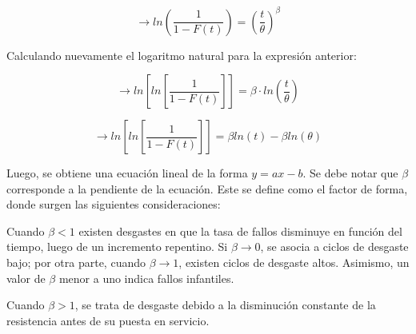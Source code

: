 \begin{equation}
\rightarrow ln\left( \frac{1}{1-F(t)} \right)=\left( \frac{t}{\theta}\right)^\beta 
\end{equation}

Calculando nuevamente el logaritmo natural para la expresión anterior:

\begin{equation}
\rightarrow ln\left[ln\left[\frac{1}{1-F(t)}\right]\right]=\beta\cdot ln\left(\frac{t}{\theta}\right)
\end{equation}

\begin{equation}
\rightarrow ln\left[ln\left[\frac{1}{1-F(t)}\right]\right]=\beta ln(t)-\beta ln(\theta)
\end{equation}

Luego, se obtiene una ecuación lineal de la forma $y=ax-b$. Se debe notar que $\beta$ corresponde a la pendiente de la ecuación. Este se define como el factor de forma, donde surgen las siguientes consideraciones:

\begin{description}
\item Cuando $\beta<1$ existen desgastes en que la tasa de fallos disminuye en función del tiempo, luego de un incremento repentino. Si $\beta\rightarrow0$, se asocia a ciclos de desgaste bajo; por otra parte, cuando $\beta\rightarrow1$, existen ciclos de desgaste altos. Asimismo, un valor de $\beta$ menor a uno indica fallos infantiles.
\item Cuando $\beta>1$, se trata de desgaste debido a la disminución constante de la resistencia antes de su puesta en servicio.
\end{description}

